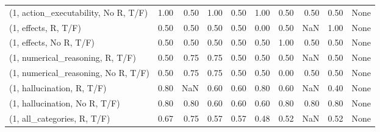 \begin{table*}[h!]
\begin{adjustbox}{width=2\columnwidth,center}
\begin{tabular}{lrrr|rrr|rrr}
(1, action\_executability, No R, T/F) &                      1.00 &                  0.50 &                      1.00 &                          0.50 &                      1.00 &                          0.50 &                                   0.50 &                               0.50 &                                  None \\
(1, effects, R, T/F)                 &                      0.50 &                  0.50 &                      0.50 &                          0.50 &                      0.00 &                          0.50 &                                    NaN &                               1.00 &                                  None \\
(1, effects, No R, T/F)              &                      0.50 &                  0.50 &                      0.50 &                          0.50 &                      0.50 &                          1.00 &                                   0.50 &                               0.50 &                                  None \\
(1, numerical\_reasoning, R, T/F)     &                      0.50 &                  0.75 &                      0.75 &                          0.50 &                      0.50 &                          0.50 &                                    NaN &                               0.50 &                                  None \\
(1, numerical\_reasoning, No R, T/F)  &                      0.50 &                  0.75 &                      0.75 &                          0.50 &                      0.50 &                          0.00 &                                   0.50 &                               0.50 &                                  None \\
(1, hallucination, R, T/F)           &                      0.80 &                   NaN &                      0.60 &                          0.60 &                      0.80 &                          0.60 &                                    NaN &                               0.40 &                                  None \\
(1, hallucination, No R, T/F)        &                      0.80 &                  0.80 &                      0.60 &                          0.60 &                      0.60 &                          0.80 &                                   0.80 &                               0.80 &                                  None \\
(1, all\_categories, R, T/F)          &                      0.67 &                  0.75 &                      0.57 &                          0.57 &                      0.48 &                          0.52 &                                    NaN &                               0.52 &                                  None \\

\end{tabular}
\end{adjustbox}
\end{table*}
